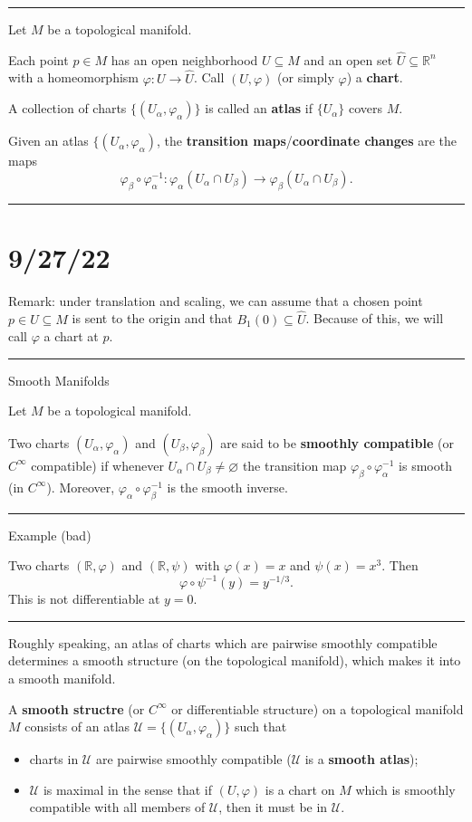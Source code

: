 \documentclass[12pt]{article}
\newcommand{\keyword}[1]{\textbf{#1}}
\newcommand{\sepline}{\rule{\textwidth}{0.4pt}}
\theoremstyle{definition}
\newcommand{\R}{\mathbb{R}}
\newcommand{\UU}{\mathcal{U}}
\renewcommand{\phi}{\varphi}
\renewcommand{\emptyset}{\varnothing}
\newcommand{\<}{\left\langle}
\renewcommand{\>}{\right\rangle}
\newcommand{\seq}{\subseteq}
\newcommand{\To}{\longrightarrow}
\renewcommand{\hat}{\widehat}
\begin{document}
\sepline

Let $M$ be a topological manifold.

Each point $p \in M$ has an open neighborhood $U \seq M$ and an open set $\hat{U} \seq \R^n$ with a homeomorphism $\phi : U \to \hat{U}$.
Call $(U, \phi)$ (or simply $\phi$) a \keyword{chart}.

A collection of charts $\{(U_\alpha, \phi_\alpha)\}$ is called an \keyword{atlas} if $\{U_\alpha\}$ covers $M$.

Given an atlas $\{(U_\alpha, \phi_\alpha)$, the \keyword{transition maps}/\keyword{coordinate changes} are the maps
\[
    \phi_\beta \circ \phi_\alpha^{-1} : \phi_\alpha(U_\alpha \cap U_\beta) \To \phi_\beta(U_\alpha \cap U_\beta).
\]

\sepline

\section*{9/27/22}

Remark: under translation and scaling, we can assume that a chosen point $p \in U \seq M$ is sent to the origin and that $B_1(0) \seq \hat{U}$.
Because of this, we will call $\phi$ a chart at $p$.

\sepline

Smooth Manifolds

Let $M$ be a topological manifold.

Two charts $(U_\alpha, \phi_\alpha)$ and $(U_\beta, \phi_\beta)$ are said to be \keyword{smoothly compatible} (or $C^\infty$ compatible) if whenever $U_\alpha \cap U_\beta \ne \emptyset$ the transition map $\phi_\beta \circ \phi_\alpha^{-1}$ is smooth (in $C^\infty$).
Moreover, $\phi_\alpha \circ \phi_\beta^{-1}$ is the smooth inverse.

\sepline

Example (bad)

Two charts $(\R, \phi)$ and $(\R, \psi)$ with $\phi(x) = x$ and $\psi(x) = x^3$.
Then
\[
    \phi \circ \psi^{-1}(y) = y^{-1/3}.
\]
This is not differentiable at $y = 0$.

\sepline

Roughly speaking, an atlas of charts which are pairwise smoothly compatible determines a smooth structure (on the topological manifold), which makes it into a smooth manifold.

A \keyword{smooth structre} (or $C^\infty$ or differentiable structure) on a topological manifold $M$ consists of an atlas $\UU = \{(U_\alpha, \phi_\alpha)\}$ such that
\begin{itemize}
    \item charts in $\UU$ are pairwise smoothly compatible ($\UU$ is a \keyword{smooth atlas});
    \item $\UU$ is maximal in the sense that if $(U, \phi)$ is a chart on $M$ which is smoothly compatible with all members of $\UU$, then it must be in $\UU$.
\end{itemize}
\end{document}
